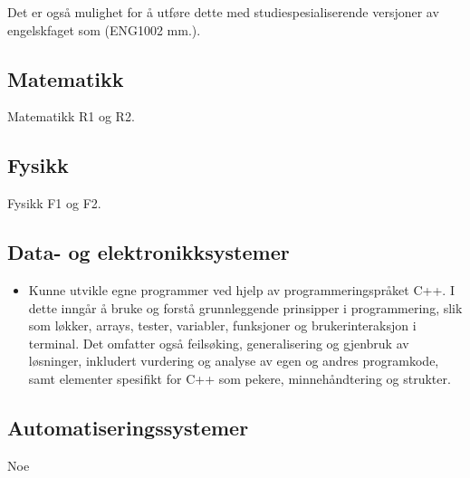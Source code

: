 		Det er også mulighet for å utføre dette med studiespesialiserende versjoner av engelskfaget som (ENG1002 mm.).


	\subsection*{Matematikk}
		Matematikk R1 og R2.


	\subsection*{Fysikk}
		Fysikk F1 og F2.


	\subsection*{Data- og elektronikksystemer}

		\begin{itemize}

			\item Kunne utvikle egne programmer ved hjelp av programmeringspråket C++. I dette inngår å bruke og forstå grunnleggende prinsipper i programmering, slik som løkker, arrays, tester, variabler, funksjoner og brukerinteraksjon i terminal. Det omfatter også feilsøking, generalisering og gjenbruk av løsninger, inkludert vurdering og analyse av egen og andres programkode, samt elementer spesifikt for C++ som pekere, minnehåndtering og strukter.

		\end{itemize}


	\subsection*{Automatiseringssystemer}
		Noe
